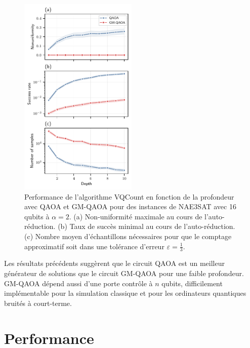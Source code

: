\begin{figure}[H]
    \centering
    \includegraphics[width=0.5\textwidth]{figures/nae3sat-depth.pdf}
    \caption[Impact de la profondeur du circuit pour \#NAE3SAT]{Performance de l'algorithme VQCount en fonction de la profondeur avec QAOA et GM-QAOA pour des instances de NAE3SAT avec 16 qubits à $\alpha=2$. (a) Non-uniformité maximale au cours de l'auto-réduction. (b) Taux de succès minimal au cours de l'auto-réduction. (c) Nombre moyen d'échantillons nécessaires pour que le comptage approximatif soit dans une tolérance d'erreur $\varepsilon = \frac{1}{3}$.}
    \label{fig:nae3sat-depth}
\end{figure}

Les résultats précédents suggèrent que le circuit QAOA est un meilleur générateur de solutions que le circuit GM-QAOA pour une faible profondeur. GM-QAOA dépend aussi d'une porte contrôle à $n$ qubits, difficilement implémentable pour la simulation classique et pour les ordinateurs quantiques bruités à court-terme. 


\section{Performance}
\label{sec:performance}


